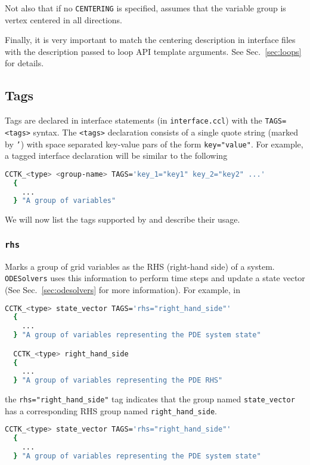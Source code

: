 Not also that if no \texttt{CENTERING} is specified, \CarpetX\space assumes that the variable group is vertex centered in all directions.

Finally, it is very important to match the centering description in interface files with the description passed to loop API template arguments. See Sec.~\ref{sec:loops} for details.

\subsection{Tags}
\label{sec:tags}

Tags are declared in interface statements (in \texttt{interface.ccl}) with the \texttt{TAGS=<tags>} syntax. The \texttt{<tags>} declaration consists of a single quote string (marked by \texttt{'}) with space separated key-value pars of the form \texttt{key="value"}. For example, a tagged interface declaration will be similar to the following
%
\begin{lstlisting}[language=bash]
  CCTK_<type> <group-name> TAGS='key_1="key1" key_2="key2" ...'
  {
    ...
  } "A group of variables"
\end{lstlisting}

We will now list the tags supported by \CarpetX\space and describe their usage.

\subsubsection{\texttt{rhs}}

Marks a group of grid variables as the RHS (right-hand side) of a system. \texttt{ODESolvers} uses this information to perform time steps and update a state vector (See Sec.~\ref{sec:odesolvers} for more information). For example, in
%
\begin{lstlisting}[language=bash]
  CCTK_<type> state_vector TAGS='rhs="right_hand_side"'
  {
    ...
  } "A group of variables representing the PDE system state"

  CCTK_<type> right_hand_side
  {
    ...
  } "A group of variables representing the PDE RHS"
\end{lstlisting}
%
the \texttt{rhs="right\_hand\_side"} tag indicates that the group named \texttt{state\_vector} has a corresponding RHS group named \texttt{right\_hand\_side}.

\begin{lstlisting}[language=bash]
  CCTK_<type> state_vector TAGS='rhs="right_hand_side"'
  {
    ...
  } "A group of variables representing the PDE system state"
\end{lstlisting}

